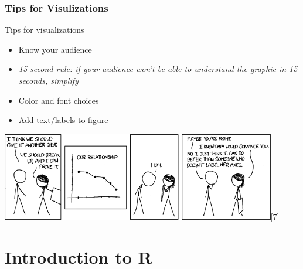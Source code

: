 \section{Tips for Visulizations}
\begin{frame}
	\begin{center}
  		\begin{block}{Tips for visualizations} 
			\begin{itemize}
				\item Know your audience 
				\item \itshape{ 15 second rule:} \normalfont if your audience won't be able to understand the graphic in 15 seconds, simplify
				\item Color and font choices
				\item Add text/labels to figure
			\end{itemize}		
		\end{block}
	\end{center} 

  \begin{center}
  	\includegraphics[width=0.9\textwidth]{images/xkcd-convincing}[7]
  \end{center}

\end{frame}

\part{Introduction to R}

